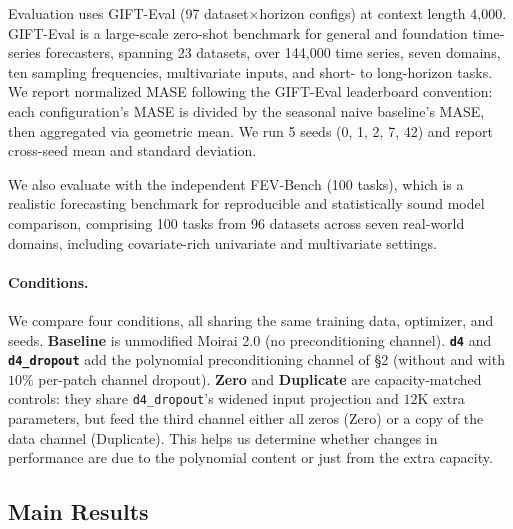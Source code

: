 \documentclass{article}
\begin{document}
Evaluation uses GIFT-Eval \citep{vijay2024gifteval} (97 dataset$\times$horizon configs) at context length 4{,}000. GIFT-Eval is a large-scale zero-shot benchmark for general and foundation time-series forecasters, spanning 23 datasets, over 144{,}000 time series, seven domains, ten sampling frequencies, multivariate inputs, and short- to long-horizon tasks. We report normalized MASE following the GIFT-Eval leaderboard convention: each configuration's MASE is divided by the seasonal naive baseline's MASE, then aggregated via geometric mean. We run 5 seeds (0, 1, 2, 7, 42) and report cross-seed mean and standard deviation.

We also evaluate with the independent FEV-Bench \citep{shchur2025fevbench} (100 tasks), which is a realistic forecasting benchmark for reproducible and statistically sound model comparison, comprising 100 tasks from 96 datasets across seven real-world domains, including covariate-rich univariate and multivariate settings. 

\paragraph{Conditions.} We compare four conditions, all sharing the same training data, optimizer, and seeds. \textbf{Baseline} is unmodified Moirai 2.0 (no preconditioning channel). \textbf{\texttt{d4}} and \textbf{\texttt{d4\_dropout}} add the polynomial preconditioning channel of \S2 (without and with $10\%$ per-patch channel dropout). \textbf{Zero} and \textbf{Duplicate} are capacity-matched controls: they share \texttt{d4\_dropout}'s widened input projection and $12$K extra parameters, but feed the third channel either all zeros (Zero) or a copy of the data channel (Duplicate). This helps us determine whether changes in performance are due to the polynomial content or just from the extra capacity. 

\subsection{Main Results}
\end{document}
